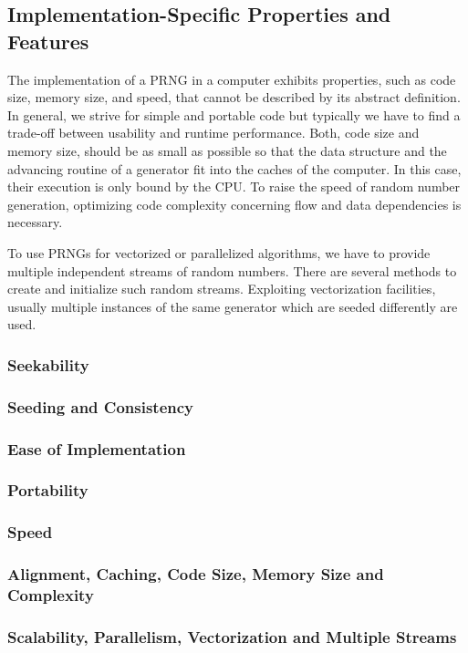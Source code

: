 \documentclass{stdlocal}
\begin{document}
  \subsection{Implementation-Specific Properties and Features}
  The implementation of a PRNG in a computer exhibits properties, such as code size, memory size, and speed, that cannot be described by its abstract definition.
  In general, we strive for simple and portable code but typically we have to find a trade-off between usability and runtime performance.
  Both, code size and memory size, should be as small as possible so that the data structure and the advancing routine of a generator fit into the caches of the computer.
  In this case, their execution is only bound by the CPU.
  To raise the speed of random number generation, optimizing code complexity concerning flow and data dependencies is necessary.

  To use PRNGs for vectorized or parallelized algorithms, we have to provide multiple independent streams of random numbers.
  There are several methods to create and initialize such random streams.
  Exploiting vectorization facilities, usually multiple instances of the same generator which are seeded differently are used.

  \subsubsection*{Seekability}
  \subsubsection*{Seeding and Consistency}
  \subsubsection*{Ease of Implementation}
  \subsubsection*{Portability}
  \subsubsection*{Speed}
  \subsubsection*{Alignment, Caching, Code Size, Memory Size and Complexity}
  \subsubsection*{Scalability, Parallelism, Vectorization and Multiple Streams}
\end{document}
